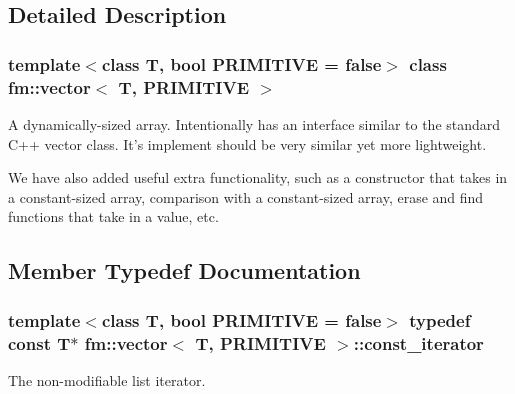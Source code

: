 \subsection{Detailed Description}
\subsubsection*{template$<$class T, bool PRIMITIVE = false$>$ class fm::vector$<$ T, PRIMITIVE $>$}

A dynamically-\/sized array. Intentionally has an interface similar to the standard C++ vector class. It's implement should be very similar yet more lightweight.

We have also added useful extra functionality, such as a constructor that takes in a constant-\/sized array, comparison with a constant-\/sized array, erase and find functions that take in a value, etc. 

\subsection{Member Typedef Documentation}
\hypertarget{classfm_1_1vector_aa012e8933574a62a4cc52e186a917722}{
\subsubsection[{const\_\-iterator}]{\setlength{\rightskip}{0pt plus 5cm}template$<$class T, bool PRIMITIVE = false$>$ typedef const T$\ast$ {\bf fm::vector}$<$ T, PRIMITIVE $>$::{\bf const\_\-iterator}}}
\label{classfm_1_1vector_aa012e8933574a62a4cc52e186a917722}
The non-\/modifiable list iterator. 

